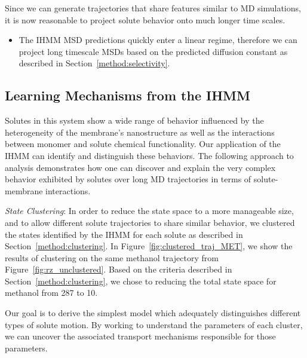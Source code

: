 \documentclass[journal=jpcbfk,manuscript=article]{achemso}
\newcommand{\nclusters}{10}
\begin{document}
  Since we can generate trajectories that share features similar to MD simulations, 
  it is now reasonable to project solute behavior onto much longer time scales.
  \begin{itemize}
    \item The IHMM MSD predictions quickly enter a linear regime, therefore we can 
    project long timescale MSDs based on the predicted diffusion constant as described
    in Section~\ref{method:selectivity}.
  \end{itemize}  
  
  
  
  \subsection{Learning Mechanisms from the IHMM}\label{section:mechanisms}
  
  Solutes in this system show a wide range of behavior influenced by the 
  heterogeneity of the membrane's nanostructure as well as the interactions 
  between monomer and solute chemical functionality. Our application of the 
  IHMM can identify and distinguish these behaviors. The following approach 
  to analysis demonstrates how one can discover and explain the very complex
  behavior exhibited by solutes over long MD trajectories in terms of 
  solute-membrane interactions.
  
  \textit{State Clustering}: In order to reduce the state space to a more 
  manageable size, and to allow different solute trajectories to share 
  similar behavior, we clustered the states identified by the IHMM for each
  solute as described in Section~\ref{method:clustering}. In 
  Figure~\ref{fig:clustered_traj_MET}, we show the results of clustering on the 
  same methanol trajectory from Figure~\ref{fig:rz_unclustered}. Based on 
  the criteria described in Section~\ref{method:clustering},
  we chose to reducing the total state space for methanol from 287 to \nclusters. 
  
  Our goal is to derive the simplest model which adequately distinguishes
  different types of solute motion. By working to understand the parameters of 
  each cluster, we can uncover the associated transport mechanisms responsible
  for those parameters.
  
\end{document}
